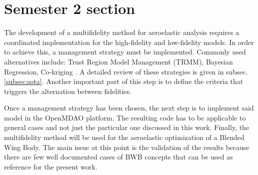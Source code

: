 \section{Semester 2 section}
\label{sec:projectissues}
The development of a multifidelity method for aeroelastic analysis requires a coordinated implementation for the high-fidelity and low-fidelity models. In order to achieve this, a management strategy must be implemented. Commonly used alternatives include: Trust Region Model Management (TRMM), Bayesian Regression, Co-kriging \cite{peherstorfer2018survey}. A detailed review of these strategies is given in subsec. \ref{subsec:sota}. Another important part of this step is to define the criteria that triggers the alternation between fidelities.

Once a management strategy has been chosen, the next step is to implement said model in the OpenMDAO platform. The resulting code has to be applicable to general cases and not just the particular one discussed in this work. Finally, the multifidelity method will be used for the aeroelastic optimization of a Blended Wing Body. The main issue at this point is the validation of the results because there are few well documented cases of BWB concepts \cite{Quinlan2019, Bryson2019} that can be used as reference for the present work. 

